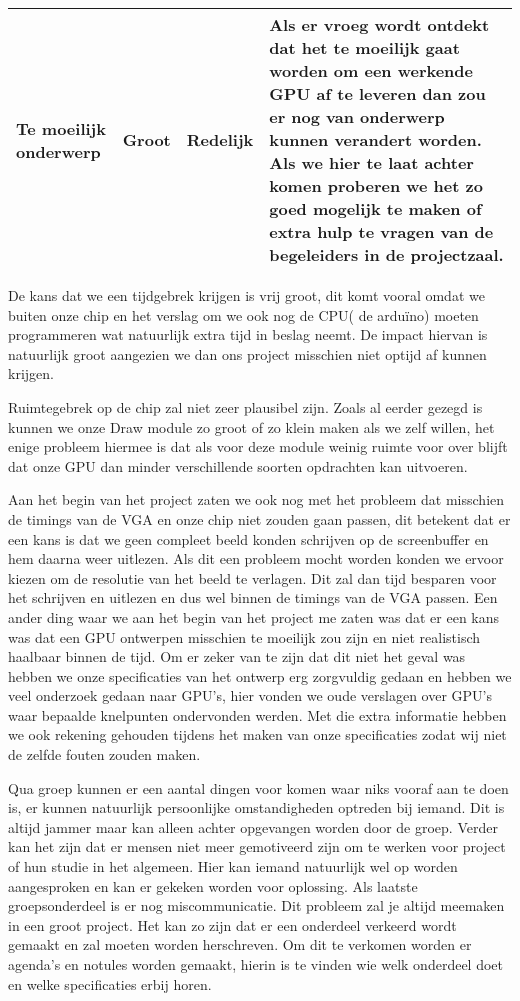 \documentclass{scrartcl} %
\begin{document}
\begin{table}[H]
\begin{tabular}{| l| l| l| p{}|}
\hline
Te moeilijk onderwerp	& Groot	& Redelijk	& Als er vroeg wordt ontdekt dat het te moeilijk gaat worden om een werkende GPU af te leveren dan zou er nog van onderwerp kunnen verandert worden. Als we hier te laat achter komen proberen we het zo goed mogelijk te maken of extra hulp te vragen van de begeleiders in de projectzaal.\\
\hline
\end{tabular}
\end{table}


De kans dat we een tijdgebrek krijgen is vrij groot, dit komt vooral omdat we buiten onze chip en het verslag om we ook nog de CPU( de arduïno) moeten programmeren wat natuurlijk extra tijd in beslag neemt. De impact hiervan is natuurlijk groot aangezien we dan ons project misschien niet optijd af kunnen krijgen.

Ruimtegebrek op de chip zal niet zeer plausibel zijn. Zoals al eerder gezegd is kunnen we onze Draw module zo groot of zo klein maken als we zelf willen, het enige probleem hiermee is dat als voor deze module weinig ruimte voor over blijft dat onze GPU dan minder verschillende soorten opdrachten kan uitvoeren.

Aan het begin van het project zaten we ook nog met het probleem dat misschien de timings van de VGA en onze chip niet zouden gaan passen, dit betekent dat er een kans is dat we geen compleet beeld konden schrijven op de screenbuffer en hem daarna weer uitlezen. Als dit een probleem mocht worden konden we ervoor kiezen om de resolutie van het beeld te verlagen. Dit zal dan tijd besparen voor het schrijven en uitlezen en dus wel binnen de timings van de VGA passen. Een ander ding waar we aan het begin van het project me zaten was dat er een kans was dat een GPU ontwerpen misschien te moeilijk zou zijn en niet realistisch haalbaar binnen de tijd. Om er zeker van te zijn dat dit niet het geval was hebben we onze specificaties van het ontwerp erg zorgvuldig gedaan en hebben we veel onderzoek gedaan naar GPU's, hier vonden we oude verslagen over GPU's waar bepaalde knelpunten ondervonden werden. Met die extra informatie hebben we ook rekening gehouden tijdens het maken van onze specificaties zodat wij niet de zelfde fouten zouden maken.

Qua groep kunnen er een aantal dingen voor komen waar niks vooraf aan te doen is, er kunnen natuurlijk persoonlijke omstandigheden optreden bij iemand. Dit is altijd jammer maar kan alleen achter opgevangen worden door de groep. Verder kan het zijn dat er mensen niet meer gemotiveerd zijn om te werken voor project of hun studie in het algemeen. Hier kan iemand natuurlijk wel op worden aangesproken en kan er gekeken worden voor oplossing. Als laatste groepsonderdeel is er nog miscommunicatie. Dit probleem zal je altijd meemaken in een groot project. Het kan zo zijn dat er een onderdeel verkeerd wordt gemaakt en zal moeten worden herschreven. Om dit te verkomen worden er agenda's en notules worden gemaakt, hierin is te vinden wie welk onderdeel doet en welke specificaties erbij horen.
\end{document}
